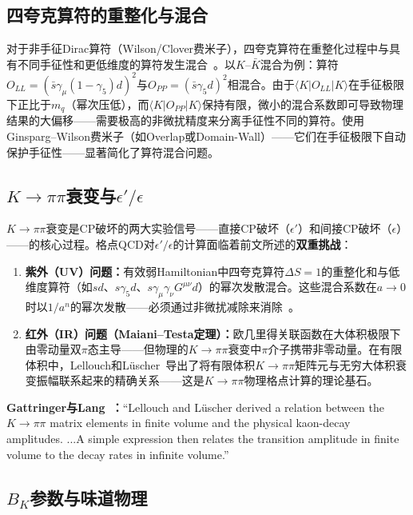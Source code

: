 \documentclass[12pt,a4paper]{ctexart}
\theoremstyle{definition}
\begin{document}
\subsection{四夸克算符的重整化与混合}

对于非手征Dirac算符（Wilson/Clover费米子），四夸克算符在重整化过程中与具有不同手征性和更低维度的算符发生混合~\cite{GattringerLang2010}。以$K\text{--}\bar K$混合为例：算符$O_{LL} = (\bar s \gamma_\mu(1-\gamma_5) d)^2$与$O_{PP} = (\bar s \gamma_5 d)^2$相混合。由于$\langle K|O_{LL}|K\rangle$在手征极限下正比于$m_q$（幂次压低），而$\langle K|O_{PP}|K\rangle$保持有限，微小的混合系数即可导致物理结果的大偏移——需要极高的非微扰精度来分离手征性不同的算符。使用Ginsparg--Wilson费米子（如Overlap或Domain-Wall）——它们在手征极限下自动保护手征性——显著简化了算符混合问题。

\subsection{$K\to\pi\pi$衰变与$\epsilon'/\epsilon$}

$K\to\pi\pi$衰变是CP破坏的两大实验信号——直接CP破坏（$\epsilon'$）和间接CP破坏（$\epsilon$）——的核心过程。格点QCD对$\epsilon'/\epsilon$的计算面临着前文所述的\textbf{双重挑战}：

\begin{enumerate}[leftmargin=*]
    \item \textbf{紫外（UV）问题：}有效弱Hamiltonian中四夸克算符$\Delta S=1$的重整化和与低维度算符（如$sd$、$s\gamma_5 d$、$s\gamma_\mu\gamma_\nu G^{\mu\nu} d$）的幂次发散混合。这些混合系数在$a\to 0$时以$1/a^n$的幂次发散——必须通过非微扰减除来消除~\cite{GattringerLang2010}。

    \item \textbf{红外（IR）问题（Maiani--Testa定理）：}欧几里得关联函数在大体积极限下由零动量双$\pi$态主导——但物理的$K\to\pi\pi$衰变中$\pi$介子携带非零动量。在有限体积中，Lellouch和L\"uscher~\cite{LellouchLuscher2001}导出了将有限体积$K\to\pi\pi$矩阵元与无穷大体积衰变振幅联系起来的精确关系——这是$K\to\pi\pi$物理格点计算的理论基石。
\end{enumerate}

\textbf{Gattringer与Lang~\cite{GattringerLang2010}：}``Lellouch and L\"uscher derived a relation between the $K\to\pi\pi$ matrix elements in finite volume and the physical kaon-decay amplitudes. ...A simple expression then relates the transition amplitude in finite volume to the decay rates in infinite volume.''

\subsection{$B_K$参数与味道物理}
\end{document}
